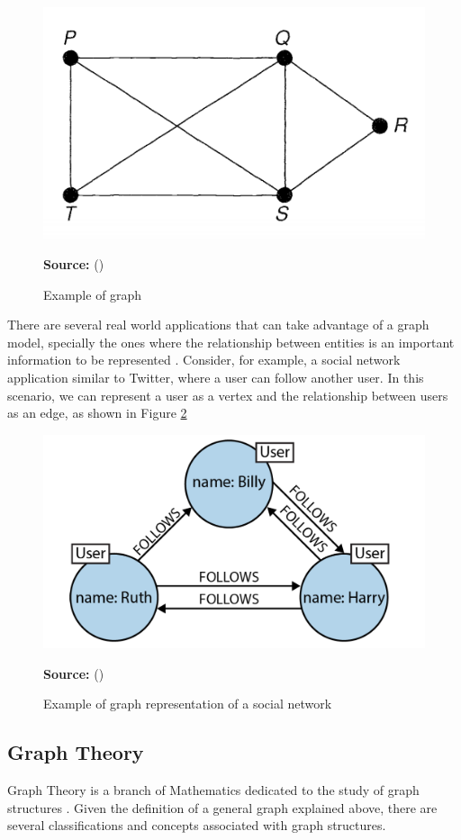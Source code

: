 \begin{figure}[ht]
\centering
\caption{Example of graph}
\label{fig:figure4}
\includegraphics[width=.4\textwidth]{images/graph_example.png}
\par\medskip\ABNTEXfontereduzida\selectfont\textbf{Source:} \citeauthor{Tobergte2013} (\citeyear{Tobergte2013}) \par\medskip
\end{figure}

There are several real world applications that can take advantage of a graph model, specially the ones where the relationship between entities is an important information to be represented \cite{Miller2013}. Consider, for example, a social network application similar to Twitter, where a user can follow another user. In this scenario, we can represent a user as a vertex and the relationship between users as an edge, as shown in Figure \ref{fig:figure5}

\begin{figure}[ht]
\centering
\caption{Example of graph representation of a social network}
\label{fig:figure5}
\includegraphics[width=.5\textwidth]{images/social_network_graph_example.png}
\par\medskip\ABNTEXfontereduzida\selectfont\textbf{Source:} \citeauthor{Miller2013} (\citeyear{Miller2013}) \par\medskip
\end{figure}

\subsection{Graph Theory}
Graph Theory is a branch of Mathematics dedicated to the study of graph structures \cite{Tobergte2013}. Given the definition of a general graph explained above, there are several classifications and concepts associated with graph structures.

